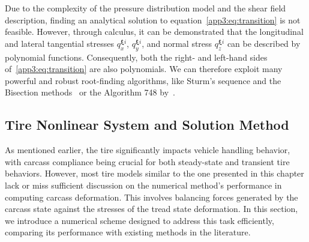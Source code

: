 Due to the complexity of the pressure distribution model and the shear field description, finding an analytical solution to equation~\eqref{app3:eq:transition} is not feasible. However, through calculus, it can be demonstrated that the longitudinal and lateral tangential stresses $q_{x}^{\bm{\xi}i}$, $q_{y}^{\bm{\xi}i}$, and normal stress $q_{z}^{\bm{\xi}i}$ can be described by polynomial functions. Consequently, both the right- and left-hand sides of~\eqref{app3:eq:transition} are also polynomials. We can therefore exploit many powerful and robust root-finding algorithms, like Sturm's sequence and the Bisection methods~\cite{bulirsch2002introduction} or the Algorithm 748 by~\citet{alefeld1995algorithm}.

\subsection{Tire Nonlinear System and Solution Method}

As mentioned earlier, the tire significantly impacts vehicle handling behavior, with carcass compliance being crucial for both steady-state and transient tire behaviors. However, most tire models similar to the one presented in this chapter lack or miss sufficient discussion on the numerical method's performance in computing carcass deformation. This involves balancing forces generated by the carcass state against the stresses of the tread state deformation. In this section, we introduce a numerical scheme designed to address this task efficiently, comparing its performance with existing methods in the literature.

